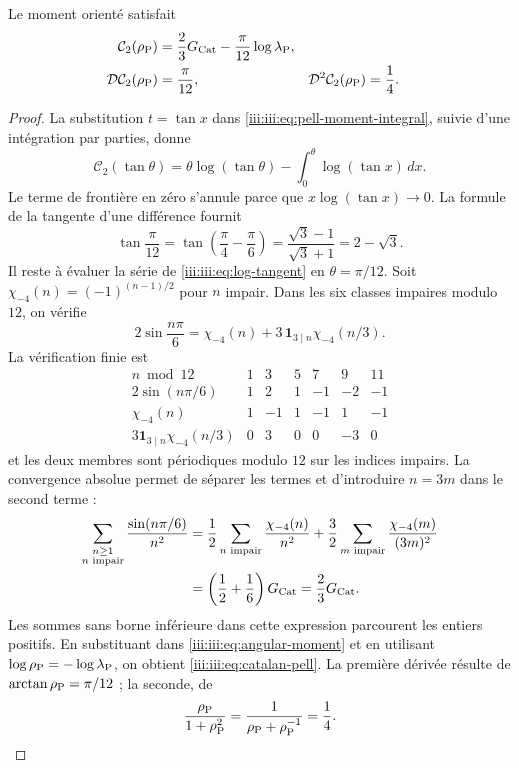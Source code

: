 \begin{theorem}
\label{iii:iii:thm:catalan-pell}
Le moment orienté satisfait
\begin{align}
 \mathcal C_2(\rho_{\rm P})
 &=\frac23G_{\rm Cat}-\frac{\pi}{12}\log\lambda_{\rm P},
 \label{iii:iii:eq:catalan-pell}\\
 \mathcal D\mathcal C_2(\rho_{\rm P})&=\frac{\pi}{12},&
 \mathcal D^2\mathcal C_2(\rho_{\rm P})&=\frac14.
 \label{iii:iii:eq:catalan-pell-derivatives}
\end{align}
\end{theorem}
\begin{proof}
La substitution $t=\tan x$ dans \eqref{iii:iii:eq:pell-moment-integral},
suivie d’une intégration par parties, donne
\begin{equation}
 \mathcal C_2(\tan\theta)
 =\theta\log(\tan\theta)
   -\int_0^\theta\log(\tan x)\,dx.
 \label{iii:iii:eq:angular-moment}
\end{equation}
Le terme de frontière en zéro s’annule parce que $x\log(\tan x)\to0$.
La formule de la tangente d’une différence fournit
\[
 \tan\frac{\pi}{12}
 =\tan\left(\frac\pi4-\frac\pi6\right)
 =\frac{\sqrt3-1}{\sqrt3+1}=2-\sqrt3.
\]
Il reste à évaluer la série de \eqref{iii:iii:eq:log-tangent} en
$\theta=\pi/12$. Soit $\chi_{-4}(n)=(-1)^{(n-1)/2}$ pour $n$ impair.
Dans les six classes impaires modulo $12$, on vérifie
\begin{equation}
 2\sin\frac{n\pi}{6}
 =\chi_{-4}(n)+3\,\mathbf1_{3\mid n}\chi_{-4}(n/3).
 \label{iii:iii:eq:character-pell}
\end{equation}
La vérification finie est
\[
\begin{array}{c|rrrrrr}
 n\bmod12&1&3&5&7&9&11\\ \hline
 2\sin(n\pi/6)&1&2&1&-1&-2&-1\\
 \chi_{-4}(n)&1&-1&1&-1&1&-1\\
 3\mathbf1_{3\mid n}\chi_{-4}(n/3)&0&3&0&0&-3&0
\end{array}
\]
et les deux membres sont périodiques modulo $12$ sur les indices impairs.
La convergence absolue permet de séparer les termes et d’introduire $n=3m$
dans le second terme :
\begin{align*}
 \sum_{\substack{n\geq1\\n\text{ impair}}}
       \frac{\sin(n\pi/6)}{n^2}
 &=\frac12\sum_{n\text{ impair}}\frac{\chi_{-4}(n)}{n^2}
  +\frac32\sum_{m\text{ impair}}\frac{\chi_{-4}(m)}{(3m)^2}\\
 &=\left(\frac12+\frac16\right)G_{\rm Cat}
 =\frac23G_{\rm Cat}.
\end{align*}
Les sommes sans borne inférieure dans cette expression parcourent les entiers
positifs. En substituant dans \eqref{iii:iii:eq:angular-moment} et en utilisant
$\log\rho_{\rm P}=-\log\lambda_{\rm P}$, on obtient
\eqref{iii:iii:eq:catalan-pell}. La première dérivée résulte de
$\arctan\rho_{\rm P}=\pi/12$ ; la seconde, de
\[
 \frac{\rho_{\rm P}}{1+\rho_{\rm P}^2}
 =\frac1{\rho_{\rm P}+\rho_{\rm P}^{-1}}=\frac14.
\]
\end{proof}

